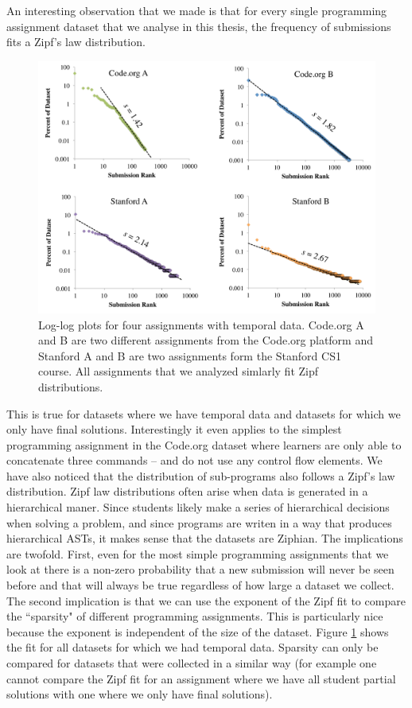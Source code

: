 An interesting observation that we made is that for every single programming assignment dataset that we analyse in this thesis, the frequency of submissions fits a Zipf's law distribution. 
\begin{figure}[ht]
\center
\includegraphics[width=1.0\textwidth]{img/zipfAll}
\caption[Submission Sparcity]{
Log-log plots for four assignments with temporal data. Code.org A and B are two different assignments from the Code.org platform and Stanford A and B are two assignments form the Stanford CS1 course. All assignments that we analyzed simlarly fit Zipf distributions.
}
\label{fig:zipfAll}
\end{figure}
This is true for datasets where we have temporal data and datasets for which we only have final solutions. Interestingly it even applies to the simplest programming assignment in the Code.org dataset where learners are only able to concatenate three commands -- and do not use any control flow elements. We have also noticed that the distribution of sub-programs also follows a Zipf's law distribution. Zipf law distributions often arise when data is generated in a hierarchical maner. Since students likely make a series of hierarchical decisions when solving a problem, and since programs are writen in a way that produces hierarchical ASTs, it makes sense that the datasets are Ziphian. The implications are twofold. First, even for the most simple programming assignments that we look at there is a non-zero probability that a new submission will never be seen before and that will always be true regardless of how large a dataset we collect. The second implication is that we can use the exponent of the Zipf fit to compare the ``sparsity" of different programming assignments. This is particularly nice because the exponent is independent of the size of the dataset. Figure \ref{fig:zipfAll} shows the fit for all datasets for which we had temporal data. Sparsity can only be compared for datasets that were collected in a similar way (for example one cannot compare the Zipf fit for an assignment where we have all student partial solutions with one where we only have final solutions).

